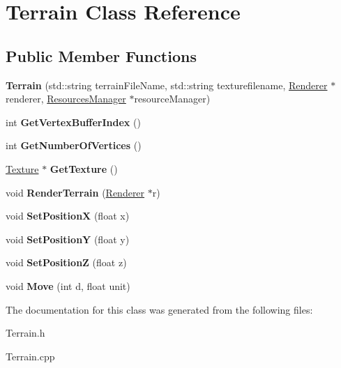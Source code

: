 \hypertarget{class_terrain}{\section{Terrain Class Reference}
\label{class_terrain}
}
\subsection*{Public Member Functions}
\begin{DoxyCompactItemize}
\item 
\hypertarget{class_terrain_a1e7ecc7dbe25498c0f08783a6a198db3}{{\bfseries Terrain} (std\-::string terrain\-File\-Name, std\-::string texturefilename, \hyperlink{class_renderer}{Renderer} $\ast$renderer, \hyperlink{class_resources_manager}{Resources\-Manager} $\ast$resource\-Manager)}\label{class_terrain_a1e7ecc7dbe25498c0f08783a6a198db3}

\item 
\hypertarget{class_terrain_a7d1361617c21885d0d816090faf462b9}{int {\bfseries Get\-Vertex\-Buffer\-Index} ()}\label{class_terrain_a7d1361617c21885d0d816090faf462b9}

\item 
\hypertarget{class_terrain_a473bffa58ac32285a843fe952de2f7aa}{int {\bfseries Get\-Number\-Of\-Vertices} ()}\label{class_terrain_a473bffa58ac32285a843fe952de2f7aa}

\item 
\hypertarget{class_terrain_a1c65ab5fa6f82c91efbdb62436366a12}{\hyperlink{class_texture}{Texture} $\ast$ {\bfseries Get\-Texture} ()}\label{class_terrain_a1c65ab5fa6f82c91efbdb62436366a12}

\item 
\hypertarget{class_terrain_af79a03a5092654b128a994202af33c82}{void {\bfseries Render\-Terrain} (\hyperlink{class_renderer}{Renderer} $\ast$r)}\label{class_terrain_af79a03a5092654b128a994202af33c82}

\item 
\hypertarget{class_terrain_aaa3ef0a4bc579804a3e3376690b027c6}{void {\bfseries Set\-Position\-X} (float x)}\label{class_terrain_aaa3ef0a4bc579804a3e3376690b027c6}

\item 
\hypertarget{class_terrain_ae54d5cbd4fd15c9936119747736df882}{void {\bfseries Set\-Position\-Y} (float y)}\label{class_terrain_ae54d5cbd4fd15c9936119747736df882}

\item 
\hypertarget{class_terrain_a37ec6c7ecc5a53d560deffcaad945fb7}{void {\bfseries Set\-Position\-Z} (float z)}\label{class_terrain_a37ec6c7ecc5a53d560deffcaad945fb7}

\item 
\hypertarget{class_terrain_af9418a77fdbf5451d34e810b7d3787fc}{void {\bfseries Move} (int d, float unit)}\label{class_terrain_af9418a77fdbf5451d34e810b7d3787fc}

\end{DoxyCompactItemize}


The documentation for this class was generated from the following files\-:\begin{DoxyCompactItemize}
\item 
Terrain.\-h\item 
Terrain.\-cpp\end{DoxyCompactItemize}
